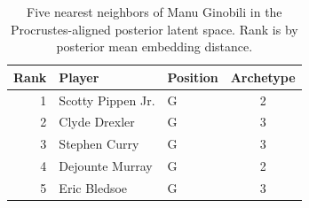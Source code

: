 \begin{table}[htbp]
  \centering\small
  \begin{tabular}{rllc}
    \toprule
    Rank & Player & Position & Archetype \\
    \midrule
    1 & Scotty Pippen Jr. & G & 2 \\
    2 & Clyde Drexler & G & 3 \\
    3 & Stephen Curry & G & 3 \\
    4 & Dejounte Murray & G & 2 \\
    5 & Eric Bledsoe & G & 3 \\
    \bottomrule
  \end{tabular}
  \caption{Five nearest neighbors of Manu Ginobili in the Procrustes-aligned posterior latent space. Rank is by posterior mean embedding distance.}
  \label{tab:Manu_Ginobili_neighbors}
\end{table}

